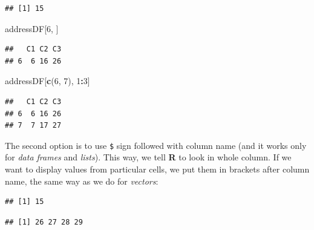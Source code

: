\documentclass[]{book}
\newenvironment{Shaded}{\begin{snugshade}}{\end{snugshade}}
\newcommand{\KeywordTok}[1]{\textcolor[rgb]{0.13,0.29,0.53}{\textbf{#1}}}
\newcommand{\DecValTok}[1]{\textcolor[rgb]{0.00,0.00,0.81}{#1}}
\newcommand{\OperatorTok}[1]{\textcolor[rgb]{0.81,0.36,0.00}{\textbf{#1}}}
\newcommand{\NormalTok}[1]{#1}
\theoremstyle{definition}
\theoremstyle{definition}
\theoremstyle{definition}
\theoremstyle{remark}
\begin{document}
\begin{verbatim}
## [1] 15
\end{verbatim}

\begin{Shaded}
\begin{Highlighting}[]
\NormalTok{addressDF[}\DecValTok{6}\NormalTok{, ]}
\end{Highlighting}
\end{Shaded}

\begin{verbatim}
##   C1 C2 C3
## 6  6 16 26
\end{verbatim}

\begin{Shaded}
\begin{Highlighting}[]
\NormalTok{addressDF[}\KeywordTok{c}\NormalTok{(}\DecValTok{6}\NormalTok{, }\DecValTok{7}\NormalTok{), }\DecValTok{1}\OperatorTok{:}\DecValTok{3}\NormalTok{]}
\end{Highlighting}
\end{Shaded}

\begin{verbatim}
##   C1 C2 C3
## 6  6 16 26
## 7  7 17 27
\end{verbatim}

The second option is to use \texttt{\$} sign followed with column name
(and it works only for \emph{data frames} and \emph{lists}). This way,
we tell \textbf{R} to look in whole column. If we want to display values
from particular cells, we put them in brackets after column name, the
same way as we do for \emph{vectors}:

\begin{Shaded}
\end{Shaded}

\begin{verbatim}
## [1] 15
\end{verbatim}

\begin{Shaded}
\end{Shaded}

\begin{verbatim}
## [1] 26 27 28 29
\end{verbatim}
\end{document}
